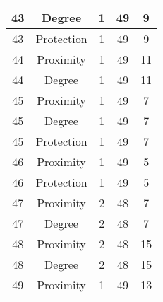 \documentclass[results.tex]{subfiles}
\begin{document}
\begin{center}
\begin{tabular}{| c || c | c | c | c |}
            \hline
            43                      & Degree                       & 1                      & 49                      & 9                    \\
            \hline
            43                      & Protection                   & 1                      & 49                      & 9                    \\
            \hline
            44                      & Proximity                    & 1                      & 49                      & 11                   \\
            \hline
            44                      & Degree                       & 1                      & 49                      & 11                   \\
            \hline
            45                      & Proximity                    & 1                      & 49                      & 7                    \\
            \hline
            45                      & Degree                       & 1                      & 49                      & 7                    \\
            \hline
            45                      & Protection                   & 1                      & 49                      & 7                    \\
            \hline
            46                      & Proximity                    & 1                      & 49                      & 5                    \\
            \hline
            46                      & Protection                   & 1                      & 49                      & 5                    \\
            \hline
            47                      & Proximity                    & 2                      & 48                      & 7                    \\
            \hline
            47                      & Degree                       & 2                      & 48                      & 7                    \\
            \hline
            48                      & Proximity                    & 2                      & 48                      & 15                   \\
            \hline
            48                      & Degree                       & 2                      & 48                      & 15                   \\
            \hline
            49                      & Proximity                    & 1                      & 49                      & 13                   \\
            \hline
        \end{tabular}
    \end{center}
\end{document}
